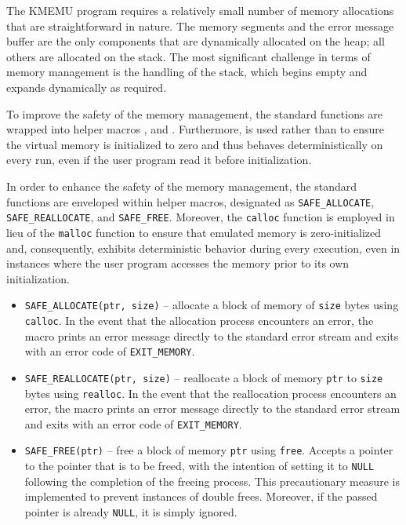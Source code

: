 \documentclass[12pt,a4paper,final]{article}
\newcommand{\code}[1]{\texttt{#1}}
\begin{document}
The KMEMU program requires a relatively small number of memory allocations that
are straightforward in nature. The memory segments and the error message buffer
are the only components that are dynamically allocated on the heap; all others
are allocated on the stack. The most significant challenge in terms of memory
management is the handling of the stack, which begins empty and expands
dynamically as required.

To improve the safety of the memory management, the standard functions are
wrapped into helper macros ,  and
. Furthermore,  is used rather than 
to ensure the virtual memory is initialized to zero and thus behaves
deterministically on every run, even if the user program read it before
initialization.

In order to enhance the safety of the memory management, the standard functions
are enveloped within helper macros, designated as \code{SAFE_ALLOCATE},
\code{SAFE_REALLOCATE}, and \code{SAFE_FREE}. Moreover, the \code{calloc}
function is employed in lieu of the \code{malloc} function to ensure that
emulated memory is zero-initialized and, consequently, exhibits deterministic
behavior during every execution, even in instances where the user program
accesses the memory prior to its own initialization.

\begin{itemize}
    \item \code{SAFE_ALLOCATE(ptr, size)} -- allocate a block of memory of
        \code{size} bytes using \code{calloc}. In the event that the allocation
        process encounters an error, the macro prints an error message directly
        to the standard error stream and exits with an error code of
        \code{EXIT_MEMORY}.
    \item \code{SAFE_REALLOCATE(ptr, size)} -- reallocate a block of memory
        \code{ptr} to \code{size} bytes using \code{realloc}. In the event that
        the reallocation process encounters an error, the macro prints an
        error message directly to the standard error stream and exits with an
        error code of \code{EXIT_MEMORY}.
    \item \code{SAFE_FREE(ptr)} -- free a block of memory \code{ptr} using
        \code{free}. Accepts a pointer to the pointer that is to be freed, with
        the intention of setting it to \code{NULL} following the completion of
        the freeing process. This precautionary measure is implemented to
        prevent instances of double frees. Moreover, if the passed pointer is
        already \code{NULL}, it is simply ignored.
\end{itemize}
\end{document}
